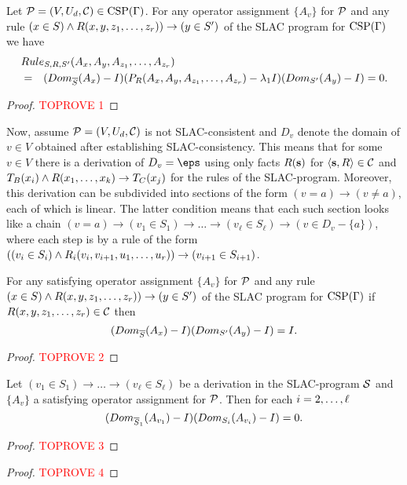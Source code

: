 \begin{lemma}\label{lem:rule-poly}
Let ${\mathcal P}=(V,U_d,{\mathcal C})\in{\rm CSP}(\Gamma)$. For any operator assignment $\{A_v\}$
for ${\mathcal P}$ and any rule $(x\in S)\wedge R(x,y,z _1,\ldots, z _{r}))\to (y\in S')$ of the SLAC program for ${\rm CSP}(\Gamma)$ we have
\begin{eqnarray*}
\lefteqn{Rule_{S,\rel,S'}(A_x,A_y,A_{z_1}\zd A_{z_r}) }\\
&=& (Dom_{\ov S}(A_x)-I)
(P_\rel(A_x,A_y,A_{z_1}\zd A_{z_r})-\ld_1I)(Dom_{S'}(A_y)-I)=0.
\end{eqnarray*}
\end{lemma}
%
\begin{proof}\textcolor{red}{TOPROVE 1}\end{proof}

Now, assume ${\mathcal P}=(V,U_d,{\mathcal C})$ is not SLAC-consistent and $D_v$ denote the domain of $v\in V$ obtained after establishing SLAC-consistency. This means that for 
some $v\in V$ there is a derivation of $D_v=\eps$ using only facts
$R({\bf s})$ for $\langle {\bf s},R \rangle\in{\mathcal C}$ and 
$T_B(x_i)\wedge R(x _1,\ldots, x _{k})\to T_C(x_j)$ for the rules of the SLAC-program. Moreover, this derivation can be subdivided into sections
of the form $(v=a)\to(v\ne a)$, each of which is linear. The latter 
condition means that each such section looks like a chain
$(v=a)\to(v_1\in S_1)\to\dots\to(v_\ell\in S_\ell)\to(v\in D_v-\{a\})$,
where each step is by a rule of the form 
$((v_i\in S_i)\wedge R_i(v_i,v_{i+1},u _1,\ldots, u _{r}))\to(v_{i+1}\in S_{i+1})$.

\begin{lemma}\label{lem:derivation-poly}
For any satisfying operator assignment $\{A_v\}$ for ${\mathcal P}$ and any rule $(x\in S)\wedge R(x,y,z _1,\ldots, z _{r}))\to (y\in S')$ of the SLAC program for ${\rm CSP}(\Gamma)$ if 
$R(x,y,z _1,\ldots, z _{r})\in{\mathcal C}$ then 
\[
(Dom_{\overline S}(A_x)-I)(Dom_{S'}(A_y)-I)=I.
\]
\end{lemma}
%
\begin{proof}\textcolor{red}{TOPROVE 2}\end{proof}

\begin{lemma}\label{lem:transitive-poly}
Let $(v_1\in S_1)\to\dots\to(v_\ell\in S_\ell)$ be a derivation in the SLAC-program ${\mathcal S}$ and $\{A_v\}$ a satisfying operator assignment for ${\mathcal P}$. 
%
Then for each $i=2,\ldots,\ell$
\[
(Dom_{\overline S_1}(A_{v_1})-I)(Dom_{S_i}(A_{v_i})-I)=0.
\]
\end{lemma}
%
\begin{proof}\textcolor{red}{TOPROVE 3}\end{proof}

\begin{proof}\textcolor{red}{TOPROVE 4}\end{proof}
